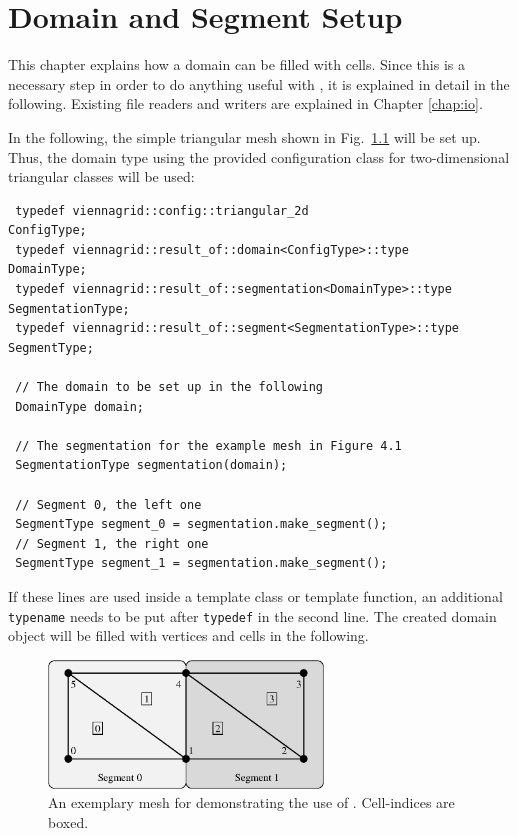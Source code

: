 \chapter{Domain and Segment Setup} \label{chap:domainsetup}

This chapter explains how a {\ViennaGrid} domain can be filled with cells. Since this
is a necessary step in order to do anything useful with {\ViennaGrid}, it is explained in detail in the following.
Existing file readers and writers are explained in Chapter \ref{chap:io}.


In the following, the simple triangular mesh shown in Fig.~\ref{fig:sampledomain} will be set up.
Thus, the domain type using the provided configuration class for two-dimensional triangular classes will be used:
\begin{lstlisting}
 typedef viennagrid::config::triangular_2d                      ConfigType;
 typedef viennagrid::result_of::domain<ConfigType>::type        DomainType;
 typedef viennagrid::result_of::segmentation<DomainType>::type  SegmentationType;
 typedef viennagrid::result_of::segment<SegmentationType>::type  SegmentType;

 // The domain to be set up in the following
 DomainType domain;
 
 // The segmentation for the example mesh in Figure 4.1
 SegmentationType segmentation(domain);
 
 // Segment 0, the left one
 SegmentType segment_0 = segmentation.make_segment();
 // Segment 1, the right one
 SegmentType segment_1 = segmentation.make_segment();
\end{lstlisting}
If these lines are used inside a template class or template function, an additional \lstinline|typename| needs to be put after \lstinline|typedef| in the second line.
The created domain object will be filled with vertices and cells in the following.

\begin{figure}[tb]
\centering
 \includegraphics[width=0.65\textwidth]{figures/sampledomain.eps}
 \caption{An exemplary mesh for demonstrating the use of {\ViennaGrid}. Cell-indices are boxed.}
 \label{fig:sampledomain}
\end{figure}

